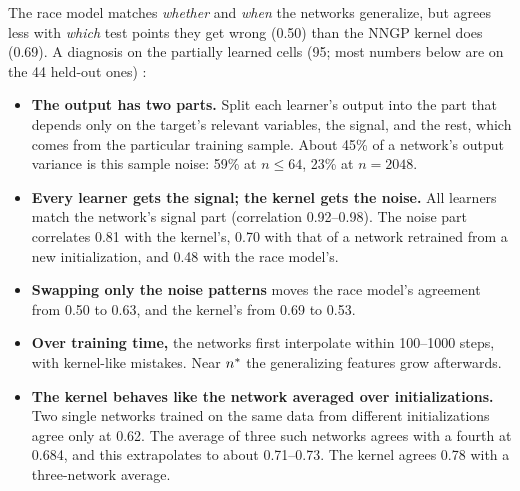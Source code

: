 The race model matches \emph{whether} and \emph{when} the networks generalize, but agrees less with \emph{which} test points they get wrong (0.50) than the NNGP kernel does (0.69). A diagnosis on the partially learned cells (95; most numbers below are on the 44 held-out ones) :
\begin{itemize}
\item \textbf{The output has two parts.} Split each learner's output into the part that depends only on the target's relevant variables, the signal, and the rest, which comes from the particular training sample. About 45\% of a network's output variance is this sample noise: 59\% at $n\le64$, 23\% at $n=2048$.
\item \textbf{Every learner gets the signal; the kernel gets the noise.} All learners match the network's signal part (correlation 0.92–0.98). The noise part correlates 0.81 with the kernel's, 0.70 with that of a network retrained from a new initialization, and 0.48 with the race model's.
\item \textbf{Swapping only the noise patterns} moves the race model's agreement from 0.50 to 0.63, and the kernel's from 0.69 to 0.53.
\item \textbf{Over training time,} the networks first interpolate within 100–1000 steps, with kernel-like mistakes. Near $n^{*}$ the generalizing features grow afterwards.
\item \textbf{The kernel behaves like the network averaged over initializations.} Two single networks trained on the same data from different initializations agree only at 0.62. The average of three such networks agrees with a fourth at 0.684, and this extrapolates to about 0.71–0.73. The kernel agrees 0.78 with a three-network average.
\end{itemize}

